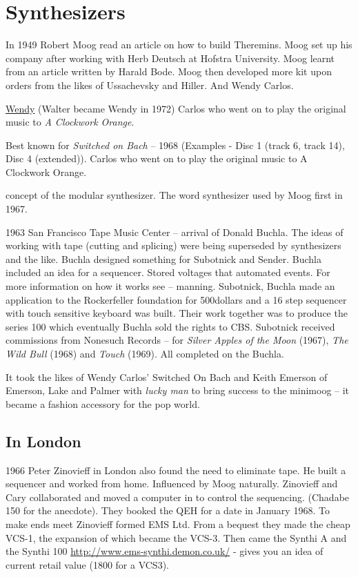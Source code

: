 \section{Synthesizers}

In 1949 Robert Moog read an article on how to build Theremins. Moog set up his company after working with Herb Deutsch at Hofstra University. Moog learnt from an article written by Harald Bode. Moog then developed more kit upon orders from the likes of Ussachevsky and Hiller. And Wendy Carlos.

\href{http://www.wendycarlos.com/}{Wendy} (Walter became Wendy in 1972) Carlos who went on to play the original music to \textit{A Clockwork Orange}.

Best known for \textit{Switched on Bach} – 1968 (Examples - Disc 1 (track 6, track 14), Disc 4 (extended)).
Carlos who went on to play the original music to A Clockwork Orange. 

concept of the modular synthesizer.  The word synthesizer used by Moog first in 1967.

1963 San Francisco Tape Music Center – arrival of Donald Buchla.  The ideas of working with tape (cutting and splicing) were being superseded by synthesizers  and the like. Buchla designed something for Subotnick and Sender.  Buchla included an idea for a sequencer.  Stored voltages that automated events.  For more information on how it works see – manning.  Subotnick, Buchla made an application to the Rockerfeller foundation for 500dollars and a 16 step sequencer with touch sensitive keyboard was built. Their work together was to produce the series 100 which eventually Buchla sold the rights to CBS.   Subotnick received commissions from Nonesuch Records – for \textit{Silver Apples of the Moon} (1967), \textit{The Wild Bull} (1968) and \textit{Touch} (1969). All completed on the Buchla.

It took the likes of Wendy Carlos' Switched On Bach and Keith Emerson of Emerson, Lake and Palmer with \textit{lucky man} to bring success to the minimoog – it became a fashion accessory for the pop world.

\subsection{In London}
1966 Peter Zinovieff in London also found the need to eliminate tape.  He built a sequencer and worked from home.  Influenced by Moog naturally. Zinovieff and Cary collaborated and moved a computer in to control the sequencing. (Chadabe 150 for the anecdote). They booked the QEH for a date in January 1968. To make ends meet Zinovieff formed EMS Ltd.  From a bequest they made the cheap VCS-1, the expansion of which became the VCS-3.  Then came the Synthi A and the Synthi 100 \url{http://www.ems-synthi.demon.co.uk/} - gives you an idea of current retail value (1800 for a VCS3).

